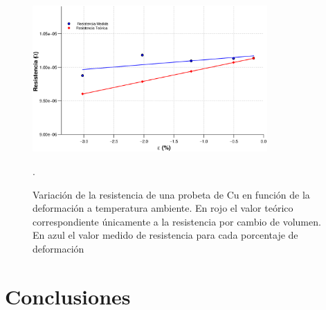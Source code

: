 \documentclass[a4paper,12pt,fleqn,twoside,openany]{book}
\begin{document}
\begin{figure}[h]
 \centering
 \includegraphics[width=0.8\textwidth]{Img/Resultados/ResDefCu.eps}
 \caption{Variación de la resistencia de una probeta de Cu en función de la deformación a temperatura ambiente. En rojo el valor teórico correspondiente únicamente a la resistencia por cambio de volumen. 
 En azul el valor medido de resistencia para cada porcentaje de deformación}. 
 \label{fig:ResDefCu}
 \end{figure}






\chapter{Conclusiones}
\end{document}
